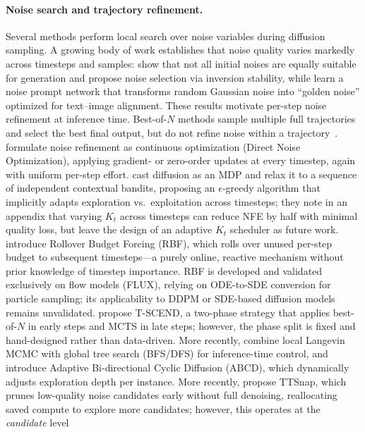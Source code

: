 \paragraph{Noise search and trajectory refinement.}
Several methods perform local search over noise variables during diffusion
sampling.
A growing body of work establishes that noise quality varies markedly
across timesteps and samples: \citet{qi2024noises} show that not all initial
noises are equally suitable for generation and propose noise selection via
inversion stability, while \citet{zhou2025golden} learn a noise prompt network
that transforms random Gaussian noise into ``golden noise'' optimized for
text--image alignment.
These results motivate per-step noise refinement at inference time.
Best-of-$N$ methods sample multiple full trajectories and select the best final
output, but do not refine noise within a trajectory~\citep{ma2024inference}.
\citet{tang2024dno} formulate noise refinement as continuous optimization
(Direct Noise Optimization), applying gradient- or zero-order updates at every
timestep, again with uniform per-step effort.
\citet{ramesh2025nts} cast diffusion as an MDP and relax it to a sequence of
independent contextual bandits, proposing an $\epsilon$-greedy algorithm that
implicitly adapts exploration vs.\ exploitation across timesteps; they note
in an appendix that varying $K_t$ across timesteps can reduce NFE by half
with minimal quality loss, but leave the design of an adaptive $K_t$ scheduler
as future work.
\citet{kim2025rbf} introduce Rollover Budget Forcing (RBF), which rolls over
unused per-step budget to subsequent timesteps---a purely online, reactive
mechanism without prior knowledge of timestep importance.
RBF is developed and validated exclusively on flow models (FLUX),
relying on ODE-to-SDE conversion for particle sampling; its applicability
to DDPM or SDE-based diffusion models remains unvalidated.
\citet{zhang2025tscend} propose T-SCEND, a two-phase strategy that
applies best-of-$N$ in early steps and MCTS in late steps; however, the
phase split is fixed and hand-designed rather than data-driven.
More recently, \citet{zhang2025classical} combine local Langevin MCMC with
global tree search (BFS/DFS) for inference-time control, and
\citet{lee2025abcd} introduce Adaptive Bi-directional Cyclic Diffusion (ABCD),
which dynamically adjusts exploration depth per instance.
More recently, \citet{ttsnap2025} propose TTSnap, which prunes low-quality
noise candidates early without full denoising, reallocating saved compute to
explore more candidates; however, this operates at the \emph{candidate} level
